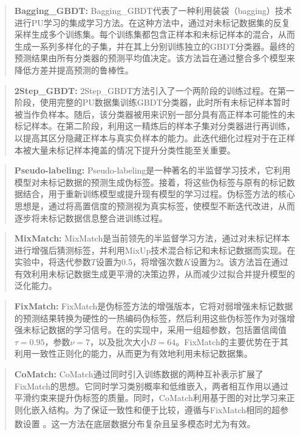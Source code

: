 \begin{quote}
	\textbf{Bagging\_GBDT:} Bagging\_GBDT代表了一种利用装袋（bagging）技术进行PU学习的集成学习方法。在这种方法中，通过对未标记数据集的反复采样生成多个训练集。每个训练集都包含正样本和未标记样本的混合，从而生成一系列多样化的子集，并在其上分别训练独立的GBDT分类器。最终的预测结果由所有分类器的预测平均值决定。该方法旨在通过整合多个模型来降低方差并提高预测的鲁棒性。
\end{quote}

\begin{quote}
	\textbf{2Step\_GBDT:} 2Step\_GBDT方法引入了一个两阶段的训练过程。在第一阶段，使用完整的PU数据集训练GBDT分类器，此时所有未标记样本暂时被当作负样本。随后，该分类器被用来识别一部分具有高正样本可能性的未标记样本。在第二阶段，利用这一精炼后的样本子集对分类器进行再训练，以提高其区分隐藏正样本与真实负样本的能力。此迭代细化过程对于在正样本被大量未标记样本掩盖的情况下提升分类性能至关重要。
\end{quote}

\begin{quote}
	\textbf{Pseudo-labeling:} Pseudo-labeling是一种著名的半监督学习技术，它利用模型对未标记数据的预测生成伪标签。接着，将这些伪标签与原有的标记数据结合，用于重新训练模型或提升现有模型的学习过程。伪标签方法的核心思想是，通过将高置信度的预测视为真实标签，使模型不断迭代改进，从而逐步将未标记数据信息整合进训练过程。
\end{quote}

\begin{quote}
	\textbf{MixMatch:} MixMatch是当前领先的半监督学习方法，通过对未标记样本进行增强后猜测标签，并利用MixUp技术混合标记和未标记数据而实现。在实验中，将迭代参数$T$设置为0.5，将增强次数$K$设置为2。该方法旨在通过有效利用未标记数据生成更平滑的决策边界，从而减少过拟合并提升模型的泛化能力。
\end{quote}

\begin{quote}
	\textbf{FixMatch:} FixMatch是伪标签方法的增强版本，它将对弱增强未标记数据的预测结果转换为硬性的一热编码伪标签，然后利用这些伪标签作为对强增强未标记数据的学习信号。在的实现中，采用一组超参数，包括置信阈值$\tau = 0.95$，参数$\nu = 7$，以及批次大小$B = 64$。FixMatch的主要优势在于其利用一致性正则化的能力，从而更为有效地利用未标记数据集。
\end{quote}

\begin{quote}
	\textbf{CoMatch:} CoMatch通过同时引入训练数据的两种互补表示扩展了FixMatch的思想。它同时学习类别概率和低维嵌入，两者相互作用以通过平滑约束来提升伪标签的质量。同时，CoMatch利用基于图的对比学习来正则化嵌入结构。为了保证一致性和便于比较，遵循与FixMatch相同的超参数设置 \textsuperscript{\cite{sohn2020fixmatch}}。这一方法在底层数据分布复杂且呈多模态时尤为有效。
\end{quote}

